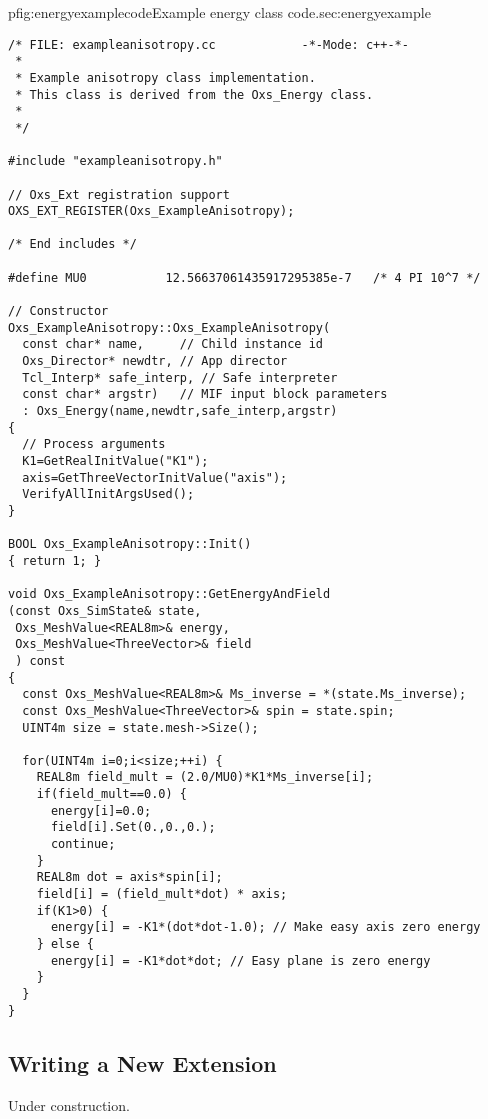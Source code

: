 \begin{codelisting}{p}{fig:energyexamplecode}{Example energy class
code.}{sec:energyexample}
\begin{verbatim}
/* FILE: exampleanisotropy.cc            -*-Mode: c++-*-
 *
 * Example anisotropy class implementation.
 * This class is derived from the Oxs_Energy class.
 *
 */

#include "exampleanisotropy.h"

// Oxs_Ext registration support
OXS_EXT_REGISTER(Oxs_ExampleAnisotropy);

/* End includes */

#define MU0           12.56637061435917295385e-7   /* 4 PI 10^7 */

// Constructor
Oxs_ExampleAnisotropy::Oxs_ExampleAnisotropy(
  const char* name,     // Child instance id
  Oxs_Director* newdtr, // App director
  Tcl_Interp* safe_interp, // Safe interpreter
  const char* argstr)   // MIF input block parameters
  : Oxs_Energy(name,newdtr,safe_interp,argstr)
{
  // Process arguments
  K1=GetRealInitValue("K1");
  axis=GetThreeVectorInitValue("axis");
  VerifyAllInitArgsUsed();
}

BOOL Oxs_ExampleAnisotropy::Init()
{ return 1; }

void Oxs_ExampleAnisotropy::GetEnergyAndField
(const Oxs_SimState& state,
 Oxs_MeshValue<REAL8m>& energy,
 Oxs_MeshValue<ThreeVector>& field
 ) const
{
  const Oxs_MeshValue<REAL8m>& Ms_inverse = *(state.Ms_inverse);
  const Oxs_MeshValue<ThreeVector>& spin = state.spin;
  UINT4m size = state.mesh->Size();

  for(UINT4m i=0;i<size;++i) {
    REAL8m field_mult = (2.0/MU0)*K1*Ms_inverse[i];
    if(field_mult==0.0) {
      energy[i]=0.0;
      field[i].Set(0.,0.,0.);
      continue;
    }
    REAL8m dot = axis*spin[i];
    field[i] = (field_mult*dot) * axis;
    if(K1>0) {
      energy[i] = -K1*(dot*dot-1.0); // Make easy axis zero energy
    } else {
      energy[i] = -K1*dot*dot; // Easy plane is zero energy
    }
  }
}
\end{verbatim}
\end{codelisting}


\subsection{Writing a New  Extension}\label{sec:energynew}
Under construction.

